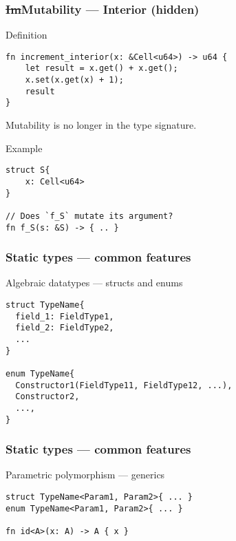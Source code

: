 \documentclass[t]{beamer}
\begin{document}
\begin{frame}[fragile]
\frametitle{\st{Im}Mutability --- Interior (hidden)}

\begin{block}{Definition}
\begin{verbatim}
fn increment_interior(x: &Cell<u64>) -> u64 {
    let result = x.get() + x.get();
    x.set(x.get(x) + 1);
    result
}
\end{verbatim}
\end{block}

Mutability is no longer in the type signature.

\begin{block}{Example}
\begin{verbatim}
struct S{
    x: Cell<u64>
}

// Does `f_S` mutate its argument?
fn f_S(s: &S) -> { .. }
\end{verbatim}
\end{block}

\end{frame}


\begin{frame}[c,fragile]
\begin{center}
\end{center}
\end{frame}


\begin{frame}[c,fragile]
\frametitle{Static types --- common features}

\begin{block}{Algebraic datatypes --- structs and enums}
\begin{verbatim}
struct TypeName{
  field_1: FieldType1,
  field_2: FieldType2,
  ...
}

enum TypeName{
  Constructor1(FieldType11, FieldType12, ...),
  Constructor2,
  ...,
}
\end{verbatim}
\end{block}

\end{frame}


\begin{frame}[c,fragile]
\frametitle{Static types --- common features}

\begin{block}{Parametric polymorphism --- generics}
\begin{verbatim}
struct TypeName<Param1, Param2>{ ... }
enum TypeName<Param1, Param2>{ ... }

fn id<A>(x: A) -> A { x }
\end{verbatim}
\end{block}

\end{frame}
\end{document}
